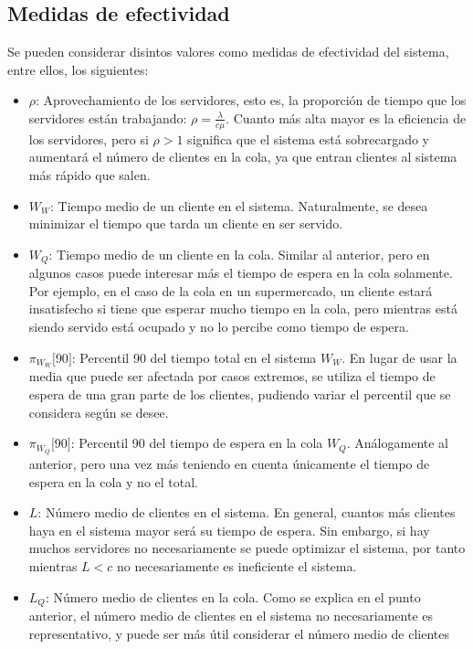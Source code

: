 \documentclass[a4paper,10pt]{scrartcl}
\theoremstyle{definition}
\theoremstyle{definition}
\numberwithin{equation}{section}
\begin{document}
	\subsection{Medidas de efectividad}
	Se pueden considerar disintos valores como medidas de efectividad del sistema, entre ellos, los siguientes:
	\begin{itemize}
		\item $\rho$:
		Aprovechamiento de los servidores, esto es, la proporción de tiempo que los servidores están trabajando: 
		$\rho = \frac{\lambda}{c\mu}$. Cuanto más alta mayor es la eficiencia de los servidores, pero 
		si $\rho > 1$ significa que el sistema está sobrecargado y aumentará el número de clientes en la cola, 
		ya que entran clientes al sistema más rápido que salen.
		\item $W_W$:
		Tiempo medio de un cliente en el sistema. Naturalmente, se desea minimizar el tiempo que tarda un 
		cliente en ser servido.
		\item $W_Q$:
		Tiempo medio de un cliente en la cola. Similar al anterior, pero en algunos casos puede interesar más 
		el tiempo de espera en la cola solamente. Por ejemplo, en el caso de la cola en un supermercado, un 
		cliente estará insatisfecho si tiene que esperar mucho tiempo en la cola, pero mientras está siendo 
		servido está ocupado y no lo percibe como tiempo de espera.
		\item $\pi_{W_W} \lbrack 90 \rbrack$:
		Percentil 90 del tiempo total en el sistema $W_W$. En lugar de usar la media que puede ser afectada por 
		casos extremos, se utiliza el tiempo de espera de una gran parte de los clientes, pudiendo variar el 
		percentil que se considera según se desee.
		\item $\pi_{W_Q} \lbrack 90 \rbrack$:
		Percentil 90 del tiempo de espera en la cola $W_Q$. Análogamente al anterior, pero una vez más teniendo en
		cuenta únicamente el tiempo de espera en la cola y no el total.
		\item $L$:
		Número medio de clientes en el sistema. En general, cuantos más clientes haya en el sistema mayor será su
		tiempo de espera. Sin embargo, si hay muchos servidores no necesariamente se puede optimizar el sistema,
		por tanto mientras $L<c$ no necesariamente es ineficiente el sistema.
		\item $L_Q$:
		Número medio de clientes en la cola. Como se explica en el punto anterior, el número medio de clientes en 
		el sistema no necesariamente es representativo, y puede ser más útil considerar el número medio de clientes

\end{itemize}
\end{document}
